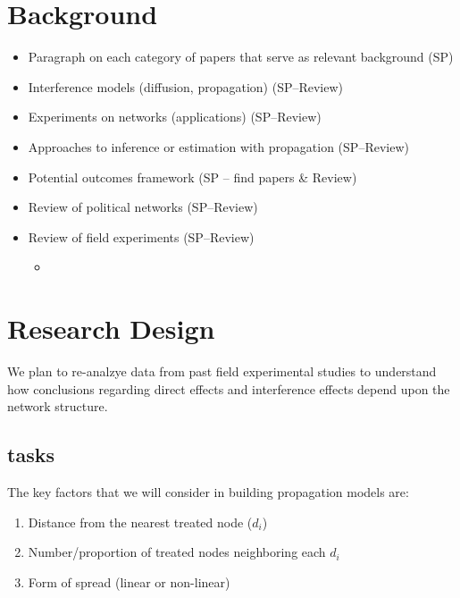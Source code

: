 \documentclass[12pt]{article}
\begin{document}
\section{Background}

\begin{itemize}
\item Paragraph on each category of papers that serve as relevant background (SP)
\item Interference models (diffusion, propagation) (SP--Review)
\item  Experiments on networks (applications) (SP--Review)
\item Approaches to inference or estimation with propagation (SP--Review) 
\item Potential outcomes framework (SP -- find papers \& Review)
\item Review of political networks (SP--Review)
\item Review of field experiments (SP--Review)
\begin{itemize}
\item \citep{Gottlieb:2015,Alatas:2012,Kalla:2015, Malesky:2012,Ichino:2012,Nyhan:2014}
\end{itemize}
\end{itemize}


\section{Research Design}

We plan to re-analzye data from past field experimental studies to understand how conclusions regarding direct effects and interference effects depend upon the network structure.

\subsection{tasks}

The key factors that we will consider in building propagation models are: \\

\begin{enumerate}

\item Distance from the nearest treated node ($d_i$)
\item Number/proportion of treated nodes neighboring each $d_i$
\item Form of spread (linear or non-linear)

\end{enumerate}
\end{document}

